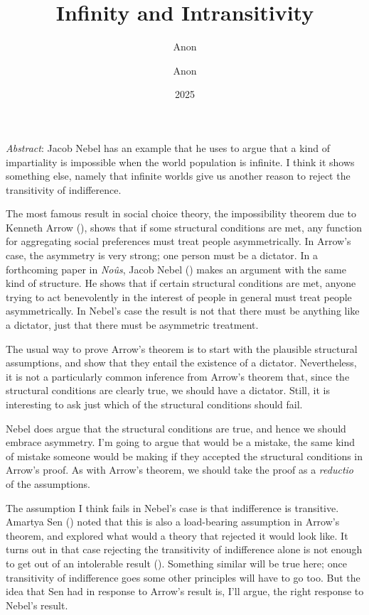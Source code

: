 \documentclass[
  11pt,
  letterpaper,
  DIV=11,
  numbers=noendperiod,
  twoside]{scrartcl}
\author{Anon}
\title{Infinity and Intransitivity}
\author{Anon}
\date{2025}
\renewenvironment{abstract}
 {\vspace{-1.25cm}
 \quotation\small\noindent\emph{Abstract}:}
 {\endquotation}
\renewenvironment{abstract}
 {\vspace{1.25cm}
 \quotation\small\noindent\emph{Abstract}:}
 {\endquotation}
\begin{document}
\maketitle
\begin{abstract}
Jacob Nebel has an example that he uses to argue that a kind of
impartiality is impossible when the world population is infinite. I
think it shows something else, namely that infinite worlds give us
another reason to reject the transitivity of indifference.
\end{abstract}


The most famous result in social choice theory, the impossibility
theorem due to Kenneth Arrow (), shows
that if some structural conditions are met, any function for aggregating
social preferences must treat people asymmetrically. In Arrow's case,
the asymmetry is very strong; one person must be a dictator. In a
forthcoming paper in \emph{Noûs}, Jacob Nebel
() makes an argument with the same kind of
structure. He shows that if certain structural conditions are met,
anyone trying to act benevolently in the interest of people in general
must treat people asymmetrically. In Nebel's case the result is not that
there must be anything like a dictator, just that there must be
asymmetric treatment.

The usual way to prove Arrow's theorem is to start with the plausible
structural assumptions, and show that they entail the existence of a
dictator. Nevertheless, it is not a particularly common inference from
Arrow's theorem that, since the structural conditions are clearly true,
we should have a dictator. Still, it is interesting to ask just which of
the structural conditions should fail.

Nebel does argue that the structural conditions are true, and hence we
should embrace asymmetry. I'm going to argue that would be a mistake,
the same kind of mistake someone would be making if they accepted the
structural conditions in Arrow's proof. As with Arrow's theorem, we
should take the proof as a \emph{reductio} of the assumptions.

The assumption I think fails in Nebel's case is that indifference is
transitive. Amartya Sen ()
noted that this is also a load-bearing assumption in Arrow's theorem,
and explored what would a theory that rejected it would look like. It
turns out in that case rejecting the transitivity of indifference alone
is not enough to get out of an intolerable result
(). Something similar will be
true here; once transitivity of indifference goes some other principles
will have to go too. But the idea that Sen had in response to Arrow's
result is, I'll argue, the right response to Nebel's result.
\end{document}
